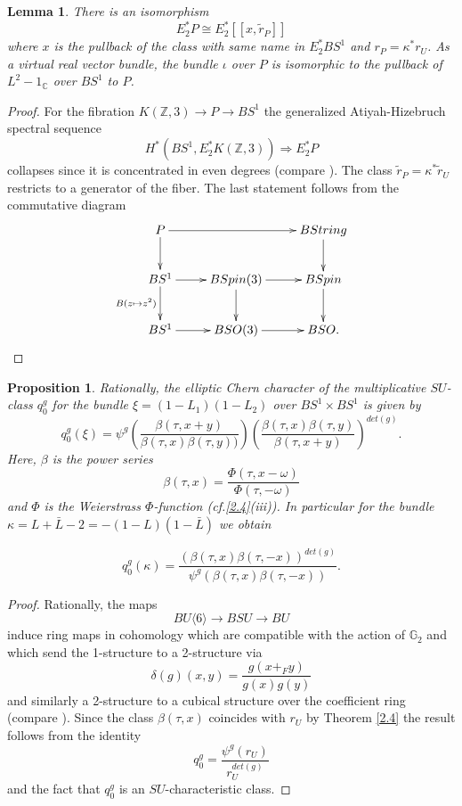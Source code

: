 \documentclass{amsart}
\newcommand {\Z}{{\mathbb Z}}
\newcommand {\C}{{\mathbb C}}
\newcommand {\G}{{\mathbb G}}
\newcommand{\lra}{\longrightarrow}              %
\numberwithin{equation}{section}
\newtheorem{prop}[thm]{Proposition}
\newtheorem{lemma}[thm]{Lemma}
\theoremstyle{definition}  %
\newtheorem{set theory}[thm]{Set Theoretic Prelude}
\begin{document}
\begin{lemma}
There is an isomorphism 
$$ E_2^*P \cong E_2^* [\! [x,\tilde{r}_P]\!] $$
where $x$ is the pullback of the class with same name in $E_2^*BS^1$ and $r_P=\kappa^*r_U$.  
As a virtual real vector bundle, 
the bundle $\iota$ over $P$ is isomorphic to the pullback of $L^2 -1_\C$ over $BS^1$ to $P$.
\end{lemma} 
\begin{proof}
For the fibration $K(\Z, 3)\lra P\lra BS^1$ the generalized Atiyah-Hizebruch spectral sequence 
$$H^*(BS^1, E_2^*K(\Z,3))\Longrightarrow E_2^*P$$
collapses since it is concentrated in even degrees (compare \cite[Proposition 2.0.1]{MR1648284}). The
class $\tilde{r}_P=\kappa^*\tilde{r}_U$ restricts to a generator of the fiber.
The last statement follows from the commutative diagram 
\begin{eqnarray}\label{Pdiagram}
\xymatrix{
P  \ar[rr]\ar[d]&&BString  \ar[d] \\
BS^1 \ar[d]_-{B(z\mapsto z^2)}\ar[r] & BSpin(3)\ar[d]\ar[r] & BSpin\ar[d] \\
BS^1\ar[r] & BSO(3)\ar[r] & BSO.
}
\end{eqnarray}
\end{proof}
\begin{prop}\label{formula q0}
Rationally, the elliptic Chern character of the multiplicative $SU$-class $q_0^g$ 
for the bundle $\xi=(1-L_1)(1-L_2)$ over $BS^1\times BS^1$ is given by
$$q_0^g (\xi)=\psi^g\left( \frac{\beta(\tau ,x+y)}{\beta(\tau ,x)\beta(\tau ,y))}\right) 
\left( \frac{\beta(\tau ,x)\beta(\tau ,y)}{\beta(\tau ,x+y)}\right)^{det(g)}.$$
Here, $\beta$ is the power series
$$\beta(\tau,x)=\frac{\Phi(\tau,x-\omega)}{\Phi(\tau,-\omega)}$$
and $\Phi$ is the Weierstrass $\Phi$-function (cf.\ref{2.4}(iii)).
In particular for the bundle $\kappa =  L+\bar{L}-2 =-(1-L)(1-\bar{L})$ we obtain

$$ q_0^g (\kappa)=\frac{ (\beta(\tau ,x)\beta(\tau ,-{x}))^{det(g)}  }{\psi^g(\beta(\tau ,x)\beta(\tau ,-{x}))} . $$
\end{prop}
\begin{proof}
Rationally, the maps
$$ BU\langle 6 \rangle \lra BSU \lra BU$$
induce ring maps in cohomology which are compatible with the action of $\G_2$ and which send the 1-structure to a 2-structure via 
$$\delta(g)(x,y)=\frac{g(x+_Fy)}{g(x)g(y)}$$
and similarly a 2-structure to a cubical structure over the coefficient ring (compare \cite{MR1869850}). Since the class $\beta(\tau, x)$ coincides with $r_U$ by Theorem \ref{2.4} 
the result follows from the identity 
$$ q_0^g=\frac{\psi^g(r_U)}{r_U^{det(g)}}$$
and the fact that $q_0^g$ is an $SU$-characteristic class.
\end{proof}
\end{document}
